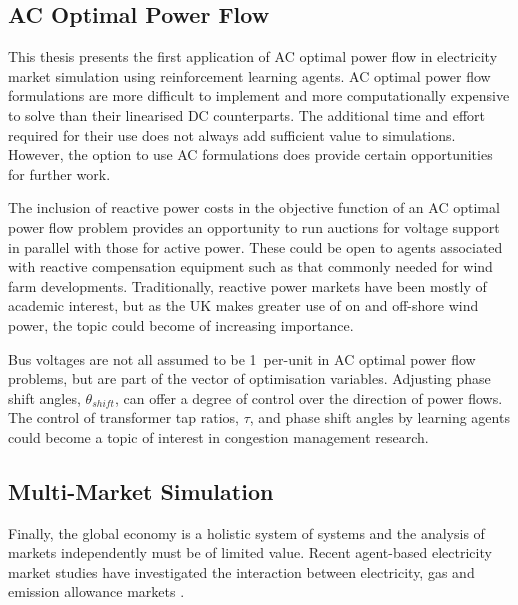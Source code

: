 
\subsection{AC Optimal Power Flow}
This thesis presents the first application of AC optimal power flow in
electricity market simulation using reinforcement learning agents.  AC optimal
power flow formulations are more difficult to implement and more computationally
expensive to solve than their linearised DC counterparts.  The
additional time and effort required for their use does not always add sufficient
value to simulations.  However, the option to use AC formulations does
provide certain opportunities for further work.

The inclusion of reactive power costs in the objective function of an AC optimal
power flow problem provides an opportunity to run auctions for voltage support
in parallel with those for active power.  These could be open to agents
associated with reactive compensation equipment such as that commonly needed for
wind farm developments.  Traditionally, reactive power markets have been mostly
of academic interest, but as the UK makes greater use of on and off-shore wind
power, the topic could become of increasing importance.

Bus voltages are not all assumed to be 1~per-unit in AC optimal power flow
problems, but are part of the vector of optimisation variables.  Adjusting
phase shift angles, $\theta_{shift}$, can offer a degree of control over
the direction of power flows.  The control of transformer tap ratios, $\tau$,
and phase shift angles by learning agents could become a topic of interest
in congestion management research.

\subsection{Multi-Market Simulation}
Finally, the global economy is a holistic system of
systems and the analysis of markets independently must be of limited value.
Recent agent-based electricity market studies have investigated the
interaction between electricity, gas and emission allowance markets
\cite{krause:gas,wang:09}.

